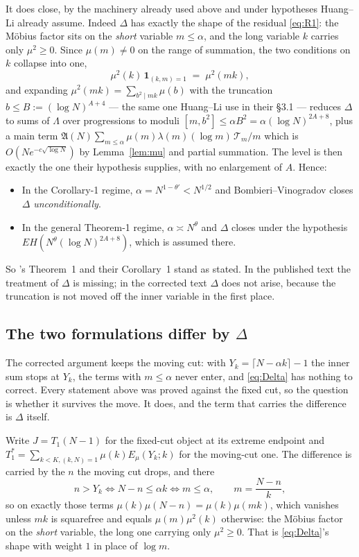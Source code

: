 \documentclass[11pt,a4paper]{article}
\theoremstyle{plain}
\theoremstyle{definition}
\theoremstyle{remark}
\newcommand{\AAA}{\mathfrak{A}}
\newcommand{\Emu}{E_\mu}
\newcommand{\Tcut}{\mathcal T}
\begin{document}
It does close, by the machinery already used above and under
hypotheses Huang--Li already assume. Indeed $\Delta$ has exactly the
shape of the residual \eqref{eq:R1}: the M\"obius factor sits on the
\emph{short} variable $m\le\alpha$, and the long variable $k$ carries
only $\mu^2\ge0$. Since $\mu(m)\neq0$ on the range of summation, the
two conditions on $k$ collapse into one,
\begin{equation}\label{eq:mu2mk}
  \mu^2(k)\,\mathbf 1_{(k,m)=1}\;=\;\mu^2(mk),
\end{equation}
and expanding $\mu^2(mk)=\sum_{b^2\mid mk}\mu(b)$ with the truncation
$b\le B:=(\log N)^{A+4}$ --- the same one Huang--Li use in their \S3.1
--- reduces $\Delta$ to sums of $\Lambda$ over progressions to moduli
$[m,b^2]\le\alpha B^2=\alpha(\log N)^{2A+8}$, plus a main term
$\AAA(N)\sum_{m\le\alpha}\mu(m)\lambda(m)(\log m)\,\Tcut_m/m$ which is
$O(Ne^{-c\sqrt{\log N}})$ by Lemma~\ref{lem:mu} and partial summation.
The level is then exactly the one their hypothesis supplies, with no
enlargement of $A$. Hence:
\begin{itemize}
\item In the Corollary-1 regime, $\alpha=N^{1-\theta'}<N^{1/2}$ and
  Bombieri--Vinogradov closes $\Delta$ \emph{unconditionally}.
\item In the general Theorem-1 regime, $\alpha\asymp N^{\theta}$ and
  $\Delta$ closes under the hypothesis
  $EH(N^{\theta}(\log N)^{2A+8})$, which is assumed there.
\end{itemize}
So \cite{HL}'s Theorem~1 and their Corollary~1 stand as stated. In the
published text the treatment of $\Delta$ is missing; in the corrected
text $\Delta$ does not arise, because the truncation is not moved off
the inner variable in the first place.

\subsection{The two formulations differ by \texorpdfstring{$\Delta$}%
{Delta}}\label{sec:movingcut}

The corrected argument keeps the moving cut: with
$Y_k=\lceil N-\alpha k\rceil-1$ the inner sum stops at $Y_k$, the terms
with $m\le\alpha$ never enter, and \eqref{eq:Delta} has nothing to
correct. Every statement above was proved against the fixed cut, so the
question is whether it survives the move. It does, and the term that
carries the difference is $\Delta$ itself.

Write $J=T_1(N-1)$ for the fixed-cut object at its extreme endpoint and
$T_1^\ast=\sum_{k<K,(k,N)=1}\mu(k)\Emu(Y_k;k)$ for the moving-cut one.
The difference is carried by the $n$ the moving cut drops, and there
\[
  n>Y_k \iff N-n\le\alpha k \iff m\le\alpha,
  \qquad m=\frac{N-n}{k},
\]
so on exactly those terms $\mu(k)\mu(N-n)=\mu(k)\mu(mk)$, which
vanishes unless $mk$ is squarefree and equals $\mu(m)\mu^2(k)$
otherwise: the M\"obius factor on the \emph{short} variable, the long
one carrying only $\mu^2\ge0$. That is \eqref{eq:Delta}'s shape with
weight $1$ in place of $\log m$.
\end{document}
